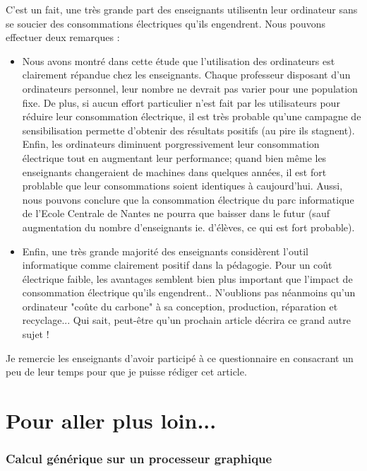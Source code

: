 \documentclass[a4paper,11pt,french]{article}
\begin{document}
C'est un fait, une très grande part des enseignants utilisentn leur ordinateur sans se soucier des consommations électriques qu'ils engendrent. Nous pouvons effectuer deux remarques :\\
\begin{itemize}
\item Nous avons montré dans cette étude que l'utilisation des ordinateurs est clairement répandue chez les enseignants. Chaque professeur disposant d'un ordinateurs personnel, leur nombre ne devrait pas varier pour une population fixe. De plus, si aucun effort particulier n'est fait par les utilisateurs pour réduire leur consommation électrique, il est très probable qu'une campagne de sensibilisation permette d'obtenir des résultats positifs (au pire ils stagnent). Enfin, les ordinateurs diminuent porgressivement leur consommation électrique tout en augmentant leur performance; quand bien même les enseignants changeraient de machines dans quelques années, il est fort problable que leur consommations soient identiques à caujourd'hui. Aussi, nous pouvons conclure que la consommation électrique du parc informatique de l'Ecole Centrale de Nantes ne pourra que baisser dans le futur (sauf augmentation du nombre d'enseignants ie. d'élèves, ce qui est fort probable).
\item Enfin, une très grande majorité des enseignants considèrent l'outil informatique comme clairement positif dans la pédagogie. Pour un coût électrique faible, les avantages semblent bien plus important que l'impact de consommation électrique qu'ils engendrent.. N'oublions pas néanmoins qu'un ordinateur "coûte du carbone" à sa conception, production, réparation et recyclage... Qui sait, peut-être qu'un prochain article décrira ce grand autre sujet !
\end{itemize}

Je remercie les enseignants d'avoir participé à ce questionnaire en consacrant un peu de leur temps pour que je puisse rédiger cet article.


\newpage
\part{Pour aller plus loin...}
\section{Calcul générique sur un processeur graphique}
\end{document}
